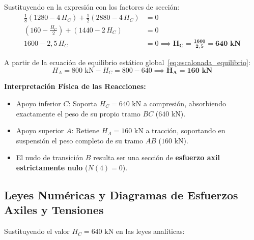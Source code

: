 Sustituyendo en la expresión con los factores de sección:
\begin{align}
    \frac{1}{8}(1280 - 4\,H_C) + \frac{1}{2}(2880 - 4\,H_C) &= 0 \nonumber \\
    \left(160 - \frac{H_C}{2}\right) + (1440 - 2\,H_C) &= 0 \nonumber \\
    1600 - 2{,}5\,H_C &= 0 \implies \mathbf{H_C = \frac{1600}{2{,}5} = 640\text{ kN}}
\end{align}

A partir de la ecuación de equilibrio estático global~\eqref{eq:escalonada_equilibrio}:
\begin{equation}
    H_A = 800\text{ kN} - H_C = 800 - 640 \implies \mathbf{H_A = 160\text{ kN}}
\end{equation}

\begin{tcolorbox}[colback=myg!10!white, colframe=myg!70!black, arc=3pt, boxrule=0.8pt]
    \textbf{Interpretación Física de las Reacciones:}
    \begin{itemize}
        \item Apoyo inferior $C$: Soporta $H_C = 640\text{ kN}$ a compresión, absorbiendo exactamente el peso de su propio tramo $BC$ ($640\text{ kN}$).
        \item Apoyo superior $A$: Retiene $H_A = 160\text{ kN}$ a tracción, soportando en suspensión el peso completo de su tramo $AB$ ($160\text{ kN}$).
        \item El nudo de transición $B$ resulta ser una sección de \textbf{esfuerzo axil estrictamente nulo} ($N(4) = 0$).
    \end{itemize}
\end{tcolorbox}

\subsection{Leyes Numéricas y Diagramas de Esfuerzos Axiles y Tensiones}

Sustituyendo el valor $H_C = 640\text{ kN}$ en las leyes analíticas:

